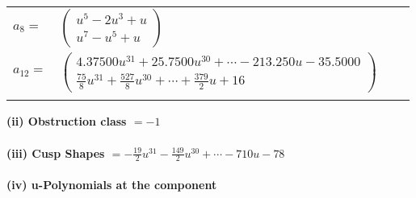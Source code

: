 \documentclass[1p]{elsarticle_modified}
\theoremstyle{definition}
\begin{document}
\begin{tabular}{m{7pt} m{180pt} m{7pt} m{180pt} }
\flushright $a_{8}=$&$\begin{pmatrix}u^5-2 u^3+u\\u^7- u^5+u\end{pmatrix}$ \\
\flushright $a_{12}=$&$\begin{pmatrix}4.37500 u^{31}+25.7500 u^{30}+\cdots-213.250 u-35.5000\\\frac{75}{8} u^{31}+\frac{527}{8} u^{30}+\cdots+\frac{379}{2} u+16\end{pmatrix}$\\&\end{tabular}
\flushleft \textbf{(ii) Obstruction class $= -1$}\\~\\
\flushleft \textbf{(iii) Cusp Shapes $= -\frac{19}{2} u^{31}-\frac{149}{2} u^{30}+\cdots-710 u-78$}\\~\\
\newpage\renewcommand{\arraystretch}{1}
\flushleft \textbf{(iv) u-Polynomials at the component}\newline \\
\end{document}
